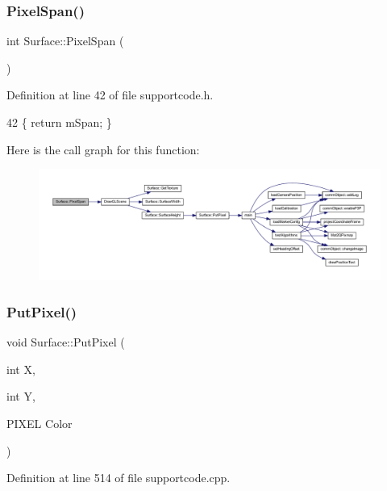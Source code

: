 \subsubsection{\texorpdfstring{Pixel\+Span()}{PixelSpan()}}
{\footnotesize\ttfamily int Surface\+::\+Pixel\+Span (\begin{DoxyParamCaption}{ }\end{DoxyParamCaption})\hspace{0.3cm}{\ttfamily [inline]}}



Definition at line 42 of file supportcode.\+h.


\begin{DoxyCode}
42 \{ \textcolor{keywordflow}{return} mSpan; \}
\end{DoxyCode}
Here is the call graph for this function\+:\nopagebreak
\begin{figure}[H]
\begin{center}
\leavevmode
\includegraphics[width=350pt]{class_surface_abe0d542404575c60911d6ad4219560f9_cgraph}
\end{center}
\end{figure}
\mbox{\label{class_surface_a728571d0386e9690ce1760931562c72b}} 
\subsubsection{\texorpdfstring{Put\+Pixel()}{PutPixel()}}
{\footnotesize\ttfamily void Surface\+::\+Put\+Pixel (\begin{DoxyParamCaption}\item[{int}]{X,  }\item[{int}]{Y,  }\item[{P\+I\+X\+EL}]{Color }\end{DoxyParamCaption})}



Definition at line 514 of file supportcode.\+cpp.


